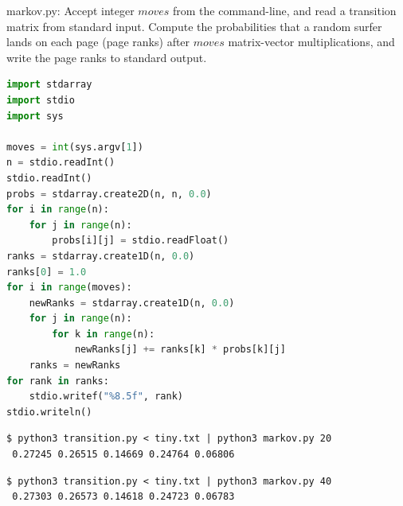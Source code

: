 \documentclass[8pt,a4paper,compress]{beamer}
\begin{document}
\begin{frame}[fragile]
\pause

\begin{framed}
\tiny markov.py: Accept integer $moves$ from the command-line, and read a transition matrix from standard input. Compute the probabilities that a
random surfer lands on each page (page ranks) after $moves$ matrix-vector multiplications, and write the page ranks to standard output.
\end{framed}

\begin{lstlisting}[language=Python,style=focusin]
import stdarray
import stdio
import sys

moves = int(sys.argv[1])
n = stdio.readInt()
stdio.readInt()
probs = stdarray.create2D(n, n, 0.0)
for i in range(n):
    for j in range(n):
        probs[i][j] = stdio.readFloat()
ranks = stdarray.create1D(n, 0.0)
ranks[0] = 1.0
for i in range(moves):
    newRanks = stdarray.create1D(n, 0.0)
    for j in range(n):
        for k in range(n):
            newRanks[j] += ranks[k] * probs[k][j]
    ranks = newRanks
for rank in ranks:
    stdio.writef("%8.5f", rank)
stdio.writeln()
\end{lstlisting}
\end{frame}

\begin{frame}[fragile]
\pause

\begin{lstlisting}[language={},style=focusin]
$ python3 transition.py < tiny.txt | python3 markov.py 20
 0.27245 0.26515 0.14669 0.24764 0.06806
\end{lstlisting}

\pause\bigskip

\begin{lstlisting}[language={},style=focusin]
$ python3 transition.py < tiny.txt | python3 markov.py 40
 0.27303 0.26573 0.14618 0.24723 0.06783
\end{lstlisting}
\end{frame}
\end{document}
